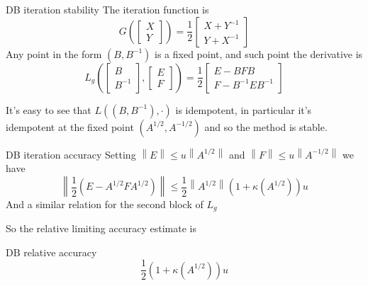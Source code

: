 \documentclass{beamer}
\theoremstyle{plain}
\theoremstyle{definition}
\theoremstyle{remark}
\newcommand{\pa}[1]{\left(#1\right)}
\newcommand{\bra}[1]{\left[#1\right]}
\newcommand{\norm}[1]{\left\|#1\right\|}
\begin{document}
\begin{frame}{DB iteration stability}
  The iteration function is
  \[ G\pa{\bra{\begin{matrix}X\\Y\end{matrix}}} = \frac{1}{2}\bra{
      \begin{matrix}
        X+Y^{-1} \\
        Y+X^{-1}
      \end{matrix}
    } \]
  Any point in the form $\pa{B,B^{-1}}$ is a fixed point, and such
  point the derivative is
  \[ L_g\pa{ \bra{ \begin{matrix}B\\B^{-1}\end{matrix}},
      \bra{\begin{matrix}E\\F\end{matrix}}} = \frac{1}{2}
    \bra{\begin{matrix} E-BFB \\ F-B^{-1}EB^{-1}\end{matrix}} \]

  It's easy to see that $L\pa{ \pa{B,B^{-1}}, \cdot}$ is idempotent,
  in particular it's idempotent at the fixed point $\pa{A^{1/2},A^{-1/2}}$
  and so the method is stable.
\end{frame}

\begin{frame}{DB iteration accuracy}
  Setting $\norm{E} \le u\norm{A^{1/2}}$ and $\norm{F} \le
  u\norm{A^{-1/2}}$ we have
  \[ \norm{\frac{1}{2}\pa{E-A^{1/2}FA^{1/2}}} \le
    \frac{1}{2}\norm{A^{1/2}}\pa{1+ \kappa\pa{A^{1/2}}}u \]
  And a similar relation for the second block of $L_g$
  \vfill

  So the relative limiting accuracy estimate is
  \begin{block}{DB relative accuracy}
    \[ \frac{1}{2}\pa{ 1 + \kappa\pa{A^{1/2}}}u \]
  \end{block}
\end{frame}
\end{document}
